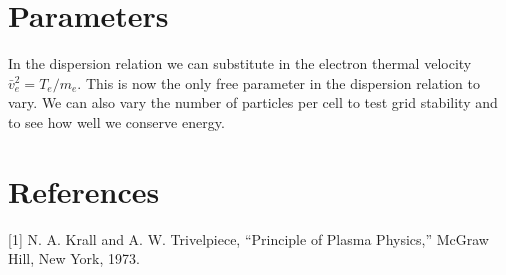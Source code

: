 \documentclass[12pt]{article}
\begin{document}
\section*{Parameters}
In the dispersion relation we can substitute in the electron thermal velocity $\bar{v}_e^2=T_e/m_e$. This is now the only free parameter in the dispersion relation to vary. We can also vary the number of particles per cell to test grid stability and to see how well we conserve energy.

\section*{References}
[1] N. A. Krall and A. W. Trivelpiece, “Principle of Plasma Physics,” McGraw Hill, New York, 1973.
\end{document}
